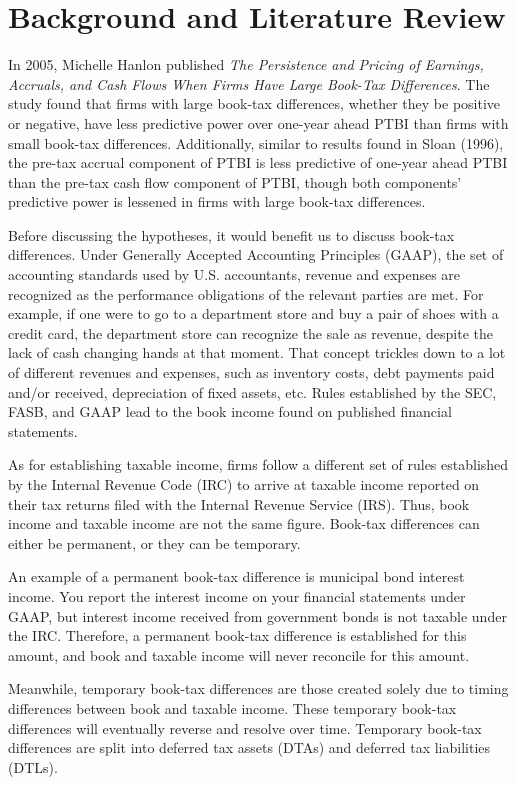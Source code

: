 \documentclass{article}
\begin{document}
\section{Background and Literature Review}
In 2005, Michelle Hanlon published \textit{The Persistence and Pricing of Earnings, Accruals, and Cash Flows When Firms Have Large Book-Tax Differences}. The study found that firms with large book-tax differences, whether they be positive or negative, have less predictive power over one-year ahead PTBI than firms with small book-tax differences. Additionally, similar to results found in Sloan (1996), the pre-tax accrual component of PTBI is less predictive of one-year ahead PTBI than the pre-tax cash flow component of PTBI, though both components’ predictive power is lessened in firms with large book-tax differences.

Before discussing the hypotheses, it would benefit us to discuss book-tax differences. Under Generally Accepted Accounting Principles (GAAP), the set of accounting standards used by U.S. accountants, revenue and expenses are recognized as the performance obligations of the relevant parties are met. For example, if one were to go to a department store and buy a pair of shoes with a credit card, the department store can recognize the sale as revenue, despite the lack of cash changing hands at that moment. That concept trickles down to a lot of different revenues and expenses, such as inventory costs, debt payments paid and/or received, depreciation of fixed assets, etc. Rules established by the SEC, FASB, and GAAP lead to the book income found on published financial statements.

As for establishing taxable income, firms follow a different set of rules established by the Internal Revenue Code (IRC) to arrive at taxable income reported on their tax returns filed with the Internal Revenue Service (IRS). Thus, book income and taxable income are not the same figure. Book-tax differences can either be permanent, or they can be temporary. 

An example of a permanent book-tax difference is municipal bond interest income. You report the interest income on your financial statements under GAAP, but interest income received from government bonds is not taxable under the IRC. Therefore, a permanent book-tax difference is established for this amount, and book and taxable income will never reconcile for this amount.

Meanwhile, temporary book-tax differences are those created solely due to timing differences between book and taxable income. These temporary book-tax differences will eventually reverse and resolve over time. Temporary book-tax differences are split into deferred tax assets (DTAs) and deferred tax liabilities (DTLs).
\end{document}
